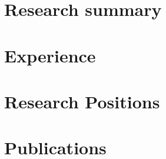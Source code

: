 \documentclass[11pt,a4paper,sans]{moderncv} %
\begin{document}
\makecvtitle %


%
\section{Research summary}



%


%

\section{Experience}





%
{
\section{Research Positions}

}{}

%
\section{Publications}

{

}{}

{

}{}


%
%
\end{document}
